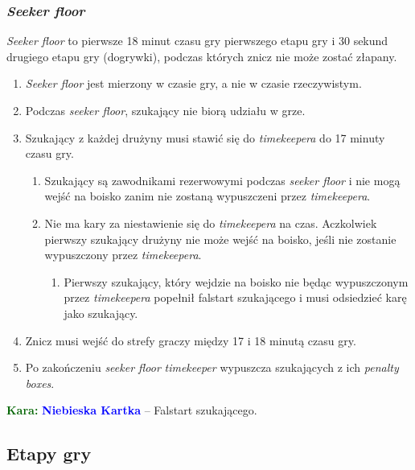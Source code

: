 \documentclass[11pt,a4paper]{article}
\newcommand\bluecard[1]{\bgroup\textcolor{darkgreen}{\textbf{Kara: }}\bgroup\textcolor{blue}{\textbf{Niebieska Kartka}} -- #1}
\begin{document}
\subsubsection{\emph{Seeker floor}}
\emph{Seeker floor} to pierwsze 18 minut czasu gry pierwszego etapu gry i 30 sekund drugiego etapu gry (dogrywki), podczas których znicz nie może zostać złapany.
\begin{enumerate}
  \item \emph{Seeker floor} jest mierzony w czasie gry, a nie w czasie rzeczywistym.
  \item Podczas \emph{seeker floor}, szukający nie biorą udziału w grze.
  \item Szukający z każdej drużyny musi stawić się do \emph{timekeepera} do 17 minuty czasu gry.
  \begin{enumerate}
    \item Szukający są zawodnikami rezerwowymi podczas \emph{seeker floor} i nie mogą wejść na boisko zanim nie zostaną wypuszczeni przez \emph{timekeepera}.
    \item Nie ma kary za niestawienie się do \emph{timekeepera} na czas. Aczkolwiek pierwszy szukający drużyny nie może wejść na boisko, jeśli nie zostanie wypuszczony przez \emph{timekeepera}.
    \begin{enumerate}
      \item Pierwszy szukający, który wejdzie na boisko nie będąc wypuszczonym przez \emph{timekeepera} popełnił falstart szukającego i musi odsiedzieć karę jako szukający.
    \end{enumerate}
  \end{enumerate}
  \item Znicz musi wejść do strefy graczy między 17 i 18 minutą czasu gry.
  \item Po zakończeniu \emph{seeker floor} \emph{timekeeper} wypuszcza szukających z ich \emph{penalty boxes}.
\end{enumerate}

\bluecard{Falstart szukającego.}

\subsection{Etapy gry}
\end{document}
